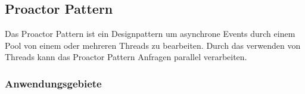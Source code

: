 \subsection{Proactor Pattern}
\label{section: Proactor Pattern}

Das Proactor Pattern ist ein Designpattern um asynchrone Events durch einem Pool von einem oder mehreren Threads zu bearbeiten. Durch das verwenden von Threads kann das Proactor Pattern Anfragen parallel verarbeiten. 

\subsubsection{Anwendungsgebiete}